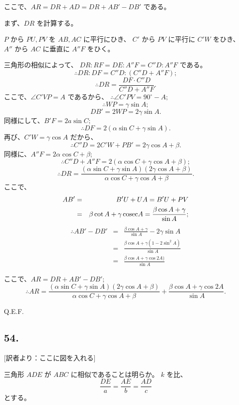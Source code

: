 ここで、$AR = DR + AD = DR + AB' - DB'$ である。

まず、$DR$ を計算する。

$P$ から $PU, PV$ を $AB, AC$ に平行にひき、
$C'$ から $PV$ に平行に $C'W$ をひき、
$A''$ から $AC$ に垂直に $A''F$ をひく。

三角形の相似によって、
$DR : RF = DE : A''F = C''D : A''F$ である。
\[
\therefore
DR : DF = C''D : (C''D + A''F);
\]
\[
\therefore
DR = \frac{DF \cdot C''D}{C''D + A''F}.
\]
ここで、$\angle C'VP = A$ であるから、
$\therefore \angle C'PV = 90^\circ - A;$
\[
\therefore
WP = \gamma \sin A;
\]
\[
DB' = 2 WP = 2 \gamma \sin A.
\]
同様にして、$B'F = 2a \sin C;$
\[
\therefore
DF = 2(\alpha \sin C + \gamma \sin A).
\]
再び、$C'W = \gamma \cos A$ だから、
\[
\therefore
C''D = 2C'W + PB' = 2 \gamma \cos A + \beta.
\]
同様に、$A''F = 2 \alpha \cos C + \beta$;
\[
\therefore
C''D + A''F = 2(\alpha \cos C + \gamma \cos A + \beta);
\]
\[
\therefore
DR = \frac{(\alpha \sin C + \gamma \sin A)(2\gamma \cos A + \beta)}{\alpha \cos C + \gamma \cos A + \beta}.
\]
ここで、
\begin{eqnarray*}
AB'
&=& B'U + UA = B'U + PV\\
&=& \beta \cot A + \gamma \, {\rm cosec} A
 = \frac{\beta \cos A + \gamma}{\sin A};
\end{eqnarray*}
\begin{eqnarray*}
\therefore
AB' - DB'
&=& \frac{\beta \cos A + \gamma}{\sin A} - 2\gamma \sin A\\
&=& \frac{\beta \cos A + \gamma(1 - 2 \sin^2 A)}{\sin A}\\
&=& \frac{\beta \cos A + \gamma \cos 2A)}{\sin A}
\end{eqnarray*}

ここで、$AR = DR + AB' - DB'$;
\[
\therefore
AR = \frac{(\alpha \sin C + \gamma \sin A)(2 \gamma \cos A + \beta)}{\alpha \cos C + \gamma \cos A + \beta}
+ \frac{\beta \cos A + \gamma \cos 2A}{\sin A}.
\]

Q.E.F.

\subsection*{54.}

[訳者より：ここに図を入れる] 

三角形 $ADE$ が $ABC$ に相似であることは明らか。
$k$ を比、
\[
\frac{DE}{a} = \frac{AE}{b} = \frac{AD}{c}
\]
とする。

